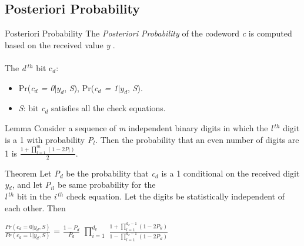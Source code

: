 \def\CTeXPreproc{Created by ctex v0.2.12, don't edit!}\documentclass{beamer}
\newcommand{\xieti}{\textsl}
\begin{document}
\subsection{Posteriori Probability}
\begin{frame}
    \begin{block}{Posteriori Probability}
        The \xieti{Posteriori Probability} of the codeword \xieti{c} is
        computed based on the received value \xieti{y} .\\
        \quad \\
        \quad The \xieti{d$^{\;th}$} bit c$_d$:
        \begin{itemize}
        \item Pr(\xieti{c$_d$ = 0}$|y_d$, \xieti{S}), Pr(\xieti{c$_d$ = 1}$|y_d$, \xieti{S}).
        \item \xieti{S}: bit \xieti{c$_d$} satisfies all the check equations.
        \end{itemize}
    \end{block}
\end{frame}
\begin{frame}
    \begin{block}{Lemma}
        Consider a sequence of \xieti{m} independent binary digits in
        which the \xieti{l$^{\;th}$} digit is a 1 with probability
        \xieti{P$_l$}. Then the probability that an even number of
        digits are 1 is $\frac{1 + \prod_{l=1}^{m}{(1-2P_l)}}{2}$.
    \end{block}
\end{frame}
\begin{frame}
    \begin{block}{Theorem}
        Let \xieti{P$_d$} be the probability that \xieti{c$_d$} is a 1 conditional on
        the received digit \xieti{y$_d$}, and let \xieti{P$_{il}$} be same probability
        for the \\\xieti{l$^{\; th}$} bit in the \xieti{i$^{\; th}$} check equation. Let
        the digits be statistically independent of each other. Then\\
        \begin{center}
        $\frac{Pr(c_d = 0|y_d, S)}{Pr(c_d = 1|y_d, S)}$ = $\frac{1-P_d}{P_d}$
        $\prod_{i=1}^{d_v}$
        $\frac{1+\prod_{l=1}^{d_c-1}(1-2P_{il})}{1-\prod_{l=1}^{d_c-1}(1-2P_{il})}$
        \end{center}
    \end{block}
\end{frame}
\end{document}
